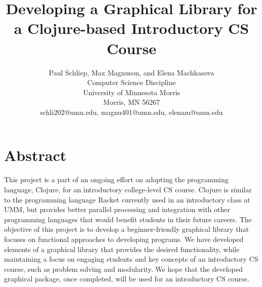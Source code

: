 \documentclass[12pt]{article}
\newcommand{\comment}[1]{}
\begin{document}
\pagestyle{plain}
%

\title{Developing a Graphical Library for a Clojure-based Introductory CS Course}
%
%

\author{
Paul Schliep, Max Magnuson, and Elena Machkasova \\
Computer Science Discipline \\
University of Minnesota Morris\\
Morris, MN 56267\\
schli202@umn.edu, magnu401@umn.edu, elenam@umn.edu
}

\date{}

\maketitle
\thispagestyle{empty}

\section*{\centering Abstract}
This project is a part of an ongoing effort on adopting the programming language, Clojure, for an introductory college-level CS course. Clojure is similar to the programming language Racket currently used in an introductory class at UMM, but provides better parallel processing and integration with other programming languages that would benefit students in their future careers. The objective of this project is to develop a beginner-friendly graphical library that focuses on functional approaches to developing programs. We have developed elements of a graphical library that provides the desired functionality, while maintaining a focus on engaging students and key concepts of an introductory CS course, such as problem solving and modularity. We hope that the developed graphical package, once completed, will be used for an introductory CS course. 
\end{document}
